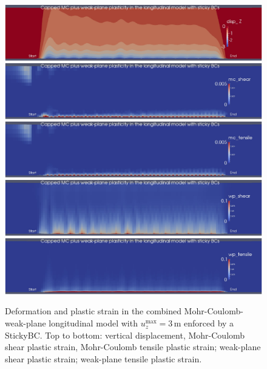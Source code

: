 \documentclass[]{scrreprt}
\begin{document}
\begin{figure}[p]
\begin{center}
\includegraphics[width=15cm]{mc_wp_sticky_longitudinal_disp.pdf} \\
\includegraphics[width=15cm]{mc_wp_sticky_longitudinal_mc_shear.pdf} \\
\includegraphics[width=15cm]{mc_wp_sticky_longitudinal_mc_tensile.pdf} \\
\includegraphics[width=15cm]{mc_wp_sticky_longitudinal_wp_shear.pdf} \\
\includegraphics[width=15cm]{mc_wp_sticky_longitudinal_wp_tensile.pdf}
\caption{Deformation and plastic strain in the combined
  Mohr-Coulomb-weak-plane longitudinal model with
  $u_{z}^{\mathrm{max}} = 3$\,m enforced by a StickyBC.  Top to
  bottom: vertical displacement, Mohr-Coulomb shear plastic strain,
  Mohr-Coulomb tensile plastic strain; weak-plane shear plastic
  strain; weak-plane tensile plastic strain.}
\label{mc_wp_sticky_longitudinal}
\end{center}
\end{figure}
\end{document}
